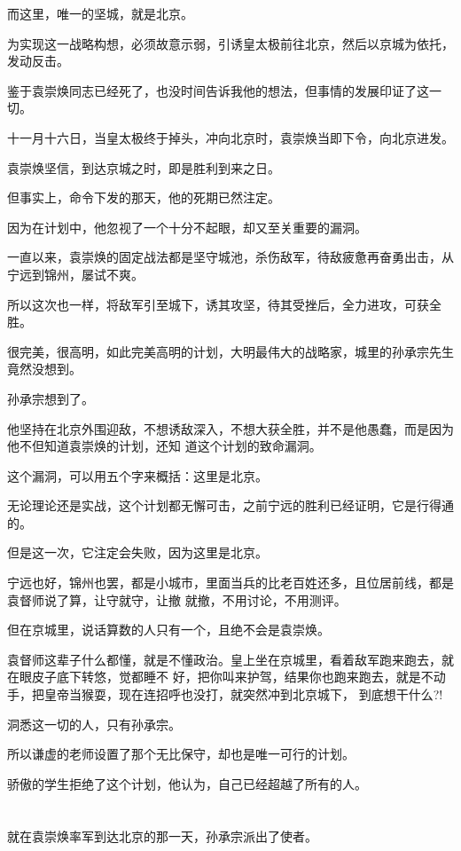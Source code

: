 \documentclass[11pt,a4paper,onecolumn]{article}
\begin{document}
而这里，唯一的坚城，就是北京。

为实现这一战略构想，必须故意示弱，引诱皇太极前往北京，然后以京城为依托，发动反击。

鉴于袁崇焕同志已经死了，也没时间告诉我他的想法，但事情的发展印证了这一切。

十一月十六日，当皇太极终于掉头，冲向北京时，袁崇焕当即下令，向北京进发。

袁崇焕坚信，到达京城之时，即是胜利到来之日。

但事实上，命令下发的那天，他的死期已然注定。

因为在计划中，他忽视了一个十分不起眼，却又至关重要的漏洞。

一直以来，袁崇焕的固定战法都是坚守城池，杀伤敌军，待敌疲惫再奋勇出击，从宁远到锦州，屡试不爽。

所以这次也一样，将敌军引至城下，诱其攻坚，待其受挫后，全力进攻，可获全胜。

很完美，很高明，如此完美高明的计划，大明最伟大的战略家，城里的孙承宗先生竟然没想到。

孙承宗想到了。

他坚持在北京外围迎敌，不想诱敌深入，不想大获全胜，并不是他愚蠢，而是因为他不但知道袁崇焕的计划，还知
道这个计划的致命漏洞。

这个漏洞，可以用五个字来概括：这里是北京。

无论理论还是实战，这个计划都无懈可击，之前宁远的胜利已经证明，它是行得通的。

但是这一次，它注定会失败，因为这里是北京。

宁远也好，锦州也罢，都是小城市，里面当兵的比老百姓还多，且位居前线，都是袁督师说了算，让守就守，让撤
就撤，不用讨论，不用测评。

但在京城里，说话算数的人只有一个，且绝不会是袁崇焕。

袁督师这辈子什么都懂，就是不懂政治。皇上坐在京城里，看着敌军跑来跑去，就在眼皮子底下转悠，觉都睡不
好，把你叫来护驾，结果你也跑来跑去，就是不动手，把皇帝当猴耍，现在连招呼也没打，就突然冲到北京城下，
到底想干什么?!

洞悉这一切的人，只有孙承宗。

所以谦虚的老师设置了那个无比保守，却也是唯一可行的计划。

骄傲的学生拒绝了这个计划，他认为，自己已经超越了所有的人。

\section[\thesection]{}

就在袁崇焕率军到达北京的那一天，孙承宗派出了使者。
\end{document}
